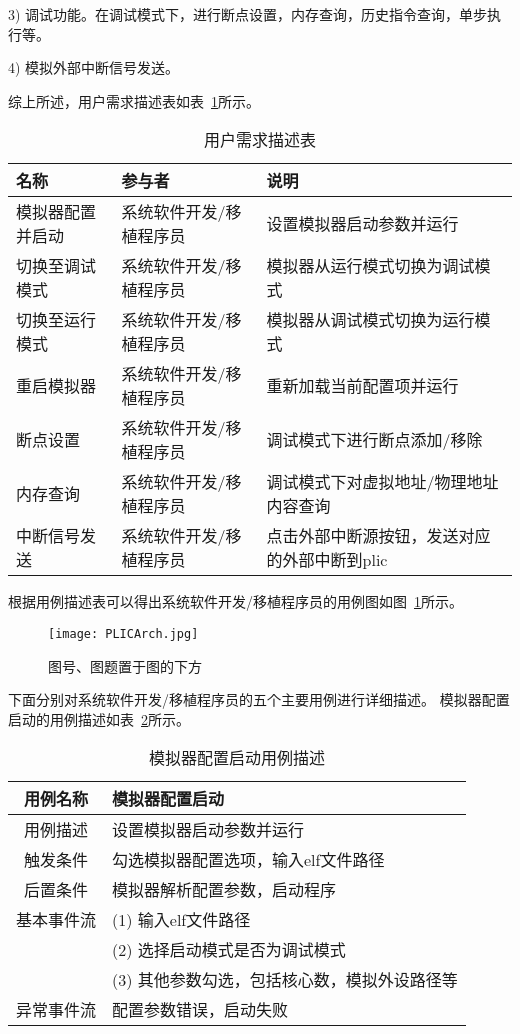 3) 调试功能。在调试模式下，进行断点设置，内存查询，历史指令查询，单步执行等。


4) 模拟外部中断信号发送。


综上所述，用户需求描述表如表~\ref{tab:tab1}所示。
\begin{table}[h]
  \centering
  \caption{用户需求描述表}
  \label{tab:tab1}
  \begin{tabular}{lll}
    \toprule
    名称   & 参与者   & 说明   \\
    \midrule
    模拟器配置并启动 & 系统软件开发/移植程序员 & 设置模拟器启动参数并运行 \\
    切换至调试模式 &	系统软件开发/移植程序员	& 模拟器从运行模式切换为调试模式\\
    切换至运行模式 & 系统软件开发/移植程序员	& 模拟器从调试模式切换为运行模式\\
    重启模拟器	& 系统软件开发/移植程序员	& 重新加载当前配置项并运行\\
    断点设置 &	系统软件开发/移植程序员 &	调试模式下进行断点添加/移除\\
    内存查询 &	系统软件开发/移植程序员 &	调试模式下对虚拟地址/物理地址内容查询\\
    中断信号发送	& 系统软件开发/移植程序员 &	点击外部中断源按钮，发送对应的外部中断到plic\\
    \bottomrule
  \end{tabular}
\end{table}


根据用例描述表可以得出系统软件开发/移植程序员的用例图如图~\ref{fig:badge}所示。


\begin{figure}[h]
  \centering
  \texttt{[image: PLICArch.jpg]}
  \caption{图号、图题置于图的下方}
  \label{fig:badge}
\end{figure}


下面分别对系统软件开发/移植程序员的五个主要用例进行详细描述。 模拟器配置启动的用例描述如表~\ref{tab:yongli1}所示。
\begin{table}[h]
  \centering
  \caption{模拟器配置启动用例描述}
  \label{tab:yongli1}
  \begin{tabular}{cl}
    \toprule
用例名称 &	模拟器配置启动\\
    \midrule
用例描述 &	设置模拟器启动参数并运行\\
触发条件 &	勾选模拟器配置选项，输入elf文件路径\\
后置条件 &	模拟器解析配置参数，启动程序\\
基本事件流	& (1)	输入elf文件路径 \\
 & (2)	选择启动模式是否为调试模式 \\
 & (3)	其他参数勾选，包括核心数，模拟外设路径等\\
异常事件流	& 配置参数错误，启动失败\\
    \bottomrule
  \end{tabular}
\end{table}


